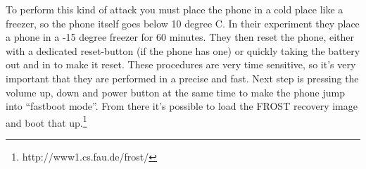 To perform this kind of attack you must place the phone in a cold place like a 
freezer, so the phone itself goes below 10 degree C. In their experiment they 
place a phone in a -15 degree freezer for 60 minutes. They then reset the phone, 
either with a dedicated reset-button (if the phone has one) or quickly taking 
the battery out and in to make it reset. These procedures are very time sensitive, 
so it’s very important that they are performed in a precise and fast. Next step 
is pressing the volume up, down and power button at the same time to make the 
phone jump into “fastboot mode”. From there it’s possible to load the FROST 
recovery image and boot that up.\footnote{http://www1.cs.fau.de/frost/}
